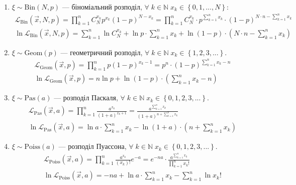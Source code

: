\begin{enumerate}
    \item $\xi \sim \mathrm{Bin}(N,p)$ --- біноміальний розподіл, $\forall \; k \in \mathbb{N} \; x_k \in \left\{0, 1, ..., N \right\}$:
    \begin{gather*}
        \mathcal{L}_{\mathrm{Bin}}(\vec{x}, N, p) = \prod\limits_{k=1}^n C_N^{x_k} p^{x_k} (1-p)^{N - x_k} = 
        \prod\limits_{k=1}^n C_N^{x_k} \cdot p^{\sum_{k=1}^n x_k} \cdot (1-p)^{N\cdot n - \sum_{k=1}^n x_k} \\
        \ln \mathcal{L}_{\mathrm{Bin}}(\vec{x}, N, p) = \sum\limits_{k=1}^n \ln C_N^{x_k} + \ln p \cdot \sum\limits_{k=1}^n x_k + 
        \ln{(1-p)} \cdot\left( N\cdot n - \sum\limits_{k=1}^n x_k\right)
    \end{gather*}
    \item $\xi \sim \mathrm{Geom}(p)$ --- геометричний розподіл, $\forall \; k \in \mathbb{N} \; x_k \in \left\{1, 2, 3, ...\right\}$. 
    \begin{gather*}
        \mathcal{L}_{\mathrm{Geom}}(\vec{x}, p) = \prod\limits_{k=1}^n p (1-p)^{x_k - 1} = p^n \cdot (1-p)^{\sum_{k=1}^n x_k - n} \\
        \ln \mathcal{L}_{\mathrm{Geom}}(\vec{x}, p) = n \ln p + \ln{(1-p)} \cdot\left(\sum\limits_{k=1}^n x_k - n\right)
    \end{gather*}
    \item $\xi \sim \mathrm{Pas}(a)$ --- розподіл Паскаля, $\forall \; k \in \mathbb{N} \; x_k \in \left\{0, 1, 2, 3, ...\right\}$. 
    \begin{gather*}
        \mathcal{L}_{\mathrm{Pas}}(\vec{x}, a) = \prod\limits_{k=1}^n \frac{a^{x_k}}{(1+a)^{x_k + 1}} = 
        \frac{a^{\sum_{k=1}^n x_k}}{(1+a)^{n + \sum_{k=1}^n x_k}} \\
        \ln \mathcal{L}_{\mathrm{Pas}}(\vec{x}, a) = \ln a \cdot \sum\limits_{k=1}^n x_k - \ln{(1+a)} \cdot \left(n+ \sum\limits_{k=1}^n x_k\right) 
    \end{gather*}
    \item $\xi \sim \mathrm{Poiss}(a)$ --- розподіл Пуассона, $\forall \; k \in \mathbb{N} \; x_k \in \left\{0, 1, 2, 3, ...\right\}$. 
    \begin{gather*}
        \mathcal{L}_{\mathrm{Poiss}}(\vec{x}, a) = \prod\limits_{k=1}^n \frac{a^{x_k}}{(x_k)!} e^{-a} = e^{-na} \cdot \frac{a^{\sum\limits_{k=1}^n x_k}}{\prod\limits_{k=1}^n x_k !} \\
        \ln \mathcal{L}_{\mathrm{Poiss}}(\vec{x}, a) = -n a + \ln a \cdot \sum\limits_{k=1}^n x_k - \sum\limits_{k=1}^n \ln{x_k!}

\end{gather*}
\end{enumerate}
